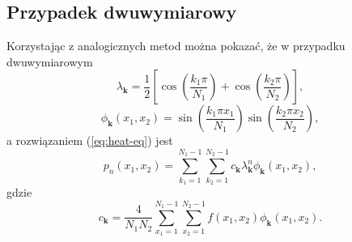 \subsection{Przypadek dwuwymiarowy}
Korzystając z analogicznych metod można pokazać, że w przypadku dwuwymiarowym
\begin{equation*}
    \lambda_\mathbf{k} = \frac{1}{2} \left[ \cos\left( \frac{k_1 \pi}{N_1} \right) + \cos\left( \frac{k_2 \pi}{N_2} \right) \right],
\end{equation*}
\begin{equation*}
    \phi_\mathbf{k}(x_1, x_2) = \sin\left( \frac{k_1 \pi x_1}{N_1} \right) \sin\left( \frac{k_2 \pi x_2}{N_2}\right),
\end{equation*}
a rozwiązaniem (\ref{eq:heat-eq}) jest
\begin{equation*}
    p_n(x_1, x_2) = \sum_{k_1=1}^{N_1-1} \sum_{k_2=1}^{N_2-1} c_\mathbf{k} \lambda_\mathbf{k}^n \phi_\mathbf{k}(x_1, x_2),
\end{equation*}
gdzie
\begin{equation*}
    c_\mathbf{k} = \frac{4}{N_1 N_2} \sum_{x_1=1}^{N_1-1} \sum_{x_2=1}^{N_2-1} f(x_1, x_2) \phi_\mathbf{k}(x_1, x_2).
\end{equation*}

